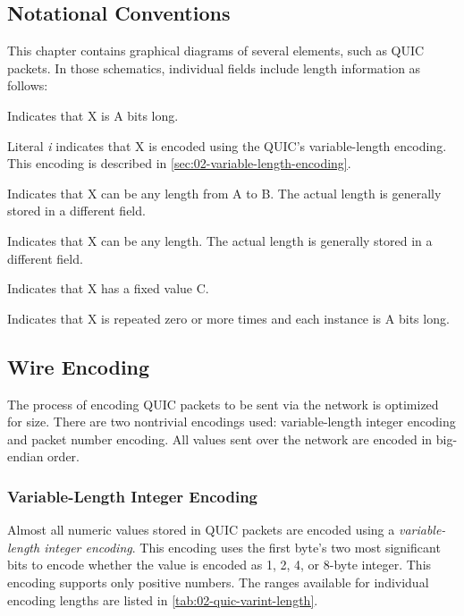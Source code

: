 \subsection{Notational Conventions}

This chapter contains graphical diagrams of several elements, such as QUIC packets. In those
schematics, individual fields include length information as follows:

\begin{itemize}

   Indicates that X is A bits long.

   Literal \textit{i} indicates that X is encoded using the QUIC's variable-length
encoding. This encoding is described in \autoref{sec:02-variable-length-encoding}.

   Indicates that X can be any length from A to B. The actual length is generally
stored in a different field.

   Indicates that X can be any length. The actual length is generally stored in a
different field.

   Indicates that X has a fixed value C.

   Indicates that X is repeated zero or more times and each instance is A bits
long.

\end{itemize}

\subsection{Wire Encoding}\label{sec:02-wire-encoding}

The process of encoding QUIC packets to be sent via the network is optimized for size. There are two
nontrivial encodings used: variable-length integer encoding and packet number encoding. All values
sent over the network are encoded in big-endian order.

\subsubsection{Variable-Length Integer Encoding}\label{sec:02-variable-length-encoding}

Almost all numeric values stored in QUIC packets are encoded using a \textit{variable-length integer
encoding}. This encoding uses the first byte's two most significant bits to encode whether the value
is encoded as 1, 2, 4, or 8-byte integer. This encoding supports only positive numbers. The ranges
available for individual encoding lengths are listed in \autoref{tab:02-quic-varint-length}.

